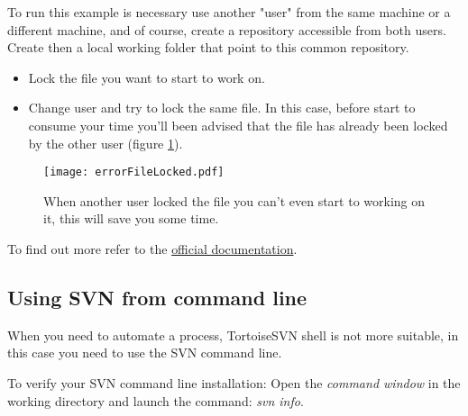 To run this example is necessary use another "user" from the same machine or a different machine, and of course, create a repository accessible from both users. Create then a local working folder that point to this common repository.\\

\begin{itemize}

    \item Lock the file you want to start to work on.
    
    \item Change user and try to lock the same file. In this case, before start to consume your time you'll been advised that the file has already been locked by the other user (figure \ref{fig:errorFileLocked}).

\end{itemize}




\begin{figure}[htbp]
    \centering
    \texttt{[image: errorFileLocked.pdf]}
    \caption{When another user locked the file you can't even start to working on it, this will save you some time.}
    \label{fig:errorFileLocked}
\end{figure}





To find out more refer to the \href{https://tortoisesvn.net/docs/release/TortoiseSVN_en/tsvn-dug-locking.html}{official documentation}.








\subsection{Using SVN from command line}
\label{subsection:SVNCommandLine}

When you need to automate a process, TortoiseSVN shell is not more suitable, 
in this case you need to use the SVN command line.\newline


To verify your SVN command line installation: Open the \textit{command window} in the working directory and launch the command: \textit{svn info}.



